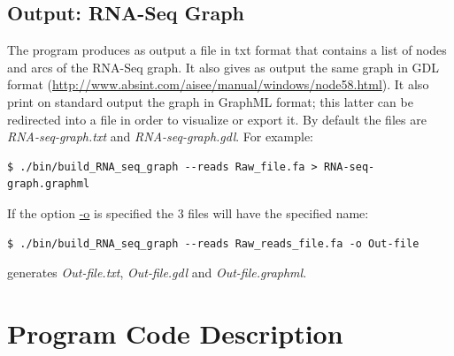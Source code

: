 \documentclass[11pt]{article}
\begin{document}
\subsection*{Output: RNA-Seq Graph}
The program produces as output a file in txt format that contains a
list of nodes and arcs of the RNA-Seq graph. It also gives as output
the same graph in GDL format
(\url{http://www.absint.com/aisee/manual/windows/node58.html}). It also
print on standard output the graph in GraphML format; this latter can
be redirected into a file in order to visualize or export it. By
default the files are \emph{RNA-seq-graph.txt} and \emph{RNA-seq-graph.gdl}. For
example:
\begin{verbatim}
$ ./bin/build_RNA_seq_graph --reads Raw_file.fa > RNA-seq-graph.graphml
\end{verbatim}
If the option \url{-o} is specified the 3 files will have the specified name:
\begin{verbatim}
$ ./bin/build_RNA_seq_graph --reads Raw_reads_file.fa -o Out-file
\end{verbatim}
generates \emph{Out-file.txt}, \emph{Out-file.gdl} and
\emph{Out-file.graphml}.

\section{Program Code Description}
\end{document}
